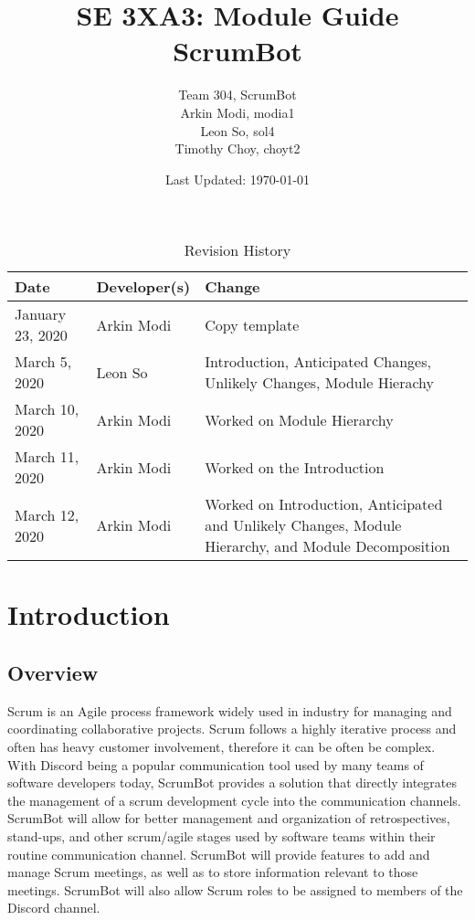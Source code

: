 \documentclass[12pt, titlepage]{article}
\title{SE 3XA3: Module Guide\\ScrumBot}
\author{
	Team 304, ScrumBot
		\\ Arkin Modi, modia1
        \\ Leon So, sol4
        \\ Timothy Choy, choyt2
}
\date{Last Updated: \today}
\begin{document}
\maketitle

\tableofcontents
\listoftables
\listoffigures

\begin{table}[H]
    \caption{Revision History} \label{TblRevisionHistory}
    \begin{tabularx}{\textwidth}{llX}
        \toprule
            \textbf{Date} & \textbf{Developer(s)} & \textbf{Change}\\
        \midrule
            January 23, 2020 & Arkin Modi & Copy template\\
            March 5, 2020 & Leon So & Introduction, Anticipated Changes, Unlikely Changes, Module Hierachy\\
            March 10, 2020 & Arkin Modi & Worked on Module Hierarchy\\
            March 11, 2020 & Arkin Modi & Worked on the Introduction\\
            March 12, 2020 & Arkin Modi & Worked on Introduction, Anticipated and Unlikely Changes,  Module Hierarchy, and Module Decomposition\\
        \bottomrule
    \end{tabularx}
\end{table}

\newpage


\section{Introduction}
\subsection{Overview} 
Scrum is an Agile process framework widely used in industry for managing and coordinating collaborative projects. Scrum follows a highly iterative process and often has heavy customer involvement, therefore it can be often be complex. With Discord being a popular communication tool used by many teams of software developers today, ScrumBot provides a solution that directly integrates the management of a scrum development cycle into the communication channels. ScrumBot will allow for better management and organization of retrospectives, stand-ups, and other scrum/agile stages used by software teams within their routine communication channel. ScrumBot will provide features to add and manage Scrum meetings, as well as to store information relevant to those meetings. ScrumBot will also allow Scrum roles to be assigned to members of the Discord channel.
\end{document}
